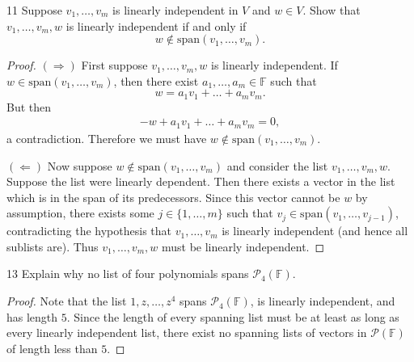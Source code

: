 \documentclass{extarticle}
\newenvironment{problem}[1]{\begin{prob*}{#1}{}}{\end{prob*}}
\newcommand{\F}{\mathbb{F}}
\newcommand{\Span}{\mathrm{span}}
\begin{document}
\begin{problem}{11}
Suppose $v_1,\dots, v_m$ is linearly independent in $V$ and $w\in V$.  Show that $v_1,\dots, v_m, w$ is linearly independent if and only if 
\begin{equation*}
w\not\in\Span(v_1,\dots,v_m).
\end{equation*}
\end{problem}
\begin{proof}
$(\Rightarrow)$ First suppose $v_1,\dots, v_m, w$ is linearly independent.  If $w\in\Span(v_1,\dots,v_m)$, then there exist $a_1,\dots, a_m\in\F$ such that
\begin{equation*}
w = a_1v_1 + \dots + a_mv_m.
\end{equation*}
But then 
\begin{align*}
-w + a_1v_1 + \dots + a_mv_m = 0,
\end{align*}
a contradiction.  Therefore we must have $w\not\in\Span(v_1,\dots,v_m)$.
\par $(\Leftarrow)$ Now suppose $w\not\in\Span(v_1,\dots, v_m)$ and consider the list $v_1,\dots,v_m, w$.  Suppose the list were linearly dependent.  Then there exists a vector in the list which is in the span of its predecessors.  Since this vector cannot be $w$ by assumption, there exists some $j\in\{1,\dots, m\}$ such that $v_j\in\Span(v_1,\dots, v_{j-1})$, contradicting the hypothesis that $v_1,\dots, v_m$ is linearly independent (and hence all sublists are).  Thus $v_1,\dots, v_m, w$ must be linearly independent.
\end{proof}

\begin{problem}{13}
Explain why no list of four polynomials spans $\mathcal{P}_4(\F)$.
\end{problem}
\begin{proof}
Note that the list $1, z, \dots, z^4$ spans $\mathcal{P}_4(\F)$, is linearly independent, and has length $5$.  Since the length of every spanning list must be at least as long as every linearly independent list, there exist no spanning lists of vectors in $\mathcal{P}(\F)$ of length less than $5$.
\end{proof}
\end{document}
